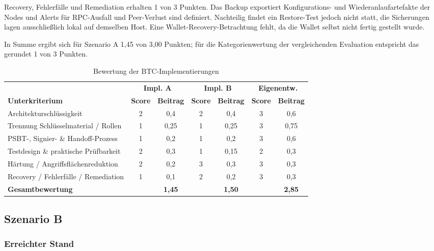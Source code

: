 Recovery, Fehlerfälle und Remediation erhalten 1 von 3 Punkten. Das Backup exportiert Konfigurations- und Wiederanlaufartefakte der Nodes und Alerts für \ac{RPC}-Ausfall und Peer-Verlust sind definiert. 
Nachteilig findet ein Restore-Test jedoch nicht statt, die Sicherungen lagen ausschließlich lokal auf demselben Host. 
Eine Wallet-Recovery-Betrachtung fehlt, da die Wallet selbst nicht fertig gestellt wurde.\cite{runbookA,selfauditA}

In Summe ergibt sich für Szenario A 1{,}45 von 3{,}00 Punkten; für die Kategorienwertung der vergleichenden Evaluation entspricht das gerundet 1 von 3 Punkten.


\begin{table}[ht]
\centering
\footnotesize
\begin{tabular}{p{4.2cm}cc|cc|cc}
\hline
& \multicolumn{2}{c|}{\textbf{Impl. A}}
& \multicolumn{2}{c|}{\textbf{Impl. B}}
& \multicolumn{2}{c}{\textbf{Eigenentw.}} \\
\textbf{Unterkriterium} & \textbf{Score} & \textbf{Beitrag}
& \textbf{Score} & \textbf{Beitrag}
& \textbf{Score} & \textbf{Beitrag} \\
\hline
Architekturschlüssigkeit & 2 & 0,4 & 2 & 0,4 & 3 & 0,6 \\
Trennung Schlüsselmaterial / Rollen & 1 & 0,25 & 1 & 0,25 & 3 & 0,75 \\
\ac{PSBT}-, Signier- \& Handoff-Prozess & 1 & 0,2 & 1 & 0,2 & 3 & 0,6 \\
Testdesign \& praktische Prüfbarkeit & 2 & 0,3 & 1 & 0,15 & 2 & 0,3 \\
Härtung / Angriffsflächenreduktion & 2 & 0,2 & 3 & 0,3 & 3 & 0,3 \\
Recovery / Fehlerfälle / Remediation & 1 & 0,1 & 2 & 0,2 & 3 & 0,3 \\
\hline
\textbf{Gesamtbewertung} & & \textbf{1,45} & & \textbf{1,50} & & \textbf{2,85} \\
\hline
\end{tabular}
\caption{Bewertung der \ac{BTC}-Implementierungen}
\label{tab:btc-detailbewertung}
\end{table}


\subsection{Szenario B}

\subsubsection{Erreichter Stand}

